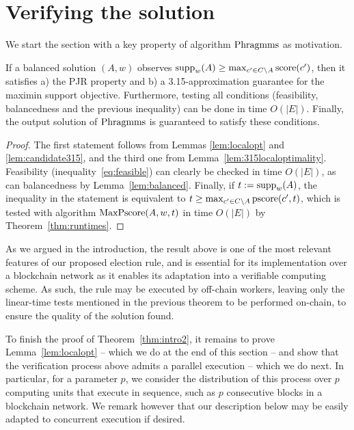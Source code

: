 \section{Verifying the solution}\label{s:local}

We start the section with a key property of algorithm $\operatorname{Phragmms}$ as motivation.

\begin{theorem}\label{thm:315guarantee}
If a balanced solution $(A,w)$ observes $\operatorname{supp}_w(A)\geq \max_{c'\in C\setminus A} \operatorname{score}(c')$, then it satisfies a) the PJR property and b) a 3.15-approximation guarantee for the maximin support objective. 
Furthermore, testing all conditions (feasibility, balancedness and the previous inequality) can be done in time $O(|E|)$. 
Finally, the output solution of $\operatorname{Phragmms}$ is guaranteed to satisfy these conditions.
\end{theorem}

\begin{proof}
The first statement follows from Lemmas \ref{lem:localopt} and \ref{lem:candidate315}, and the third one from Lemma~\ref{lem:315localoptimality}. 
Feasibility (inequality~\ref{eq:feasible}) can clearly be checked in time $O(|E|)$, as can balancedness by Lemma~\ref{lem:balanced}. 
Finally, if $t:=\operatorname{supp}_w(A)$, the inequality in the statement is equivalent to $t\geq \max_{c'\in C\setminus A} \operatorname{pscore}(c',t)$, which is tested with algorithm $\operatorname{MaxPscore}(A,w,t)$ in time $O(|E|)$ by Theorem~\ref{thm:runtimes}.
\end{proof}

As we argued in the introduction, the result above is one of the most relevant features of our proposed election rule, and is essential for its implementation over a blockchain network as it enables its adaptation into a verifiable computing scheme. As such, the rule may be executed by off-chain workers, leaving only the linear-time tests mentioned in the previous theorem to be performed on-chain, to ensure the quality of the solution found. 
   
To finish the proof of Theorem~\ref{thm:intro2}, it remains to prove Lemma~\ref{lem:localopt} -- which we do at the end of this section -- and show that the verification process above admits a parallel execution -- which we do next. 
In particular, for a parameter $p$, we consider the distribution of this process over $p$ computing units that execute in sequence, such as $p$ consecutive blocks in a blockchain network. 
We remark however that our description below may be easily adapted to concurrent execution if desired.


